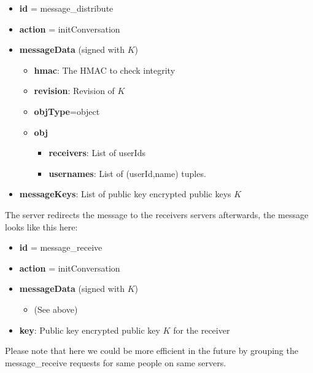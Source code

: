 \documentclass{scrartcl}
\begin{document}
\begin{itemize}
    \item \textbf{id} = message\_distribute
    \item \textbf{action} = initConversation
    \item \textbf{messageData} (signed with $K$)
  \begin{itemize}
    \item \textbf{hmac}: The HMAC to check integrity
    \item \textbf{revision}: Revision of $K$
    \item \textbf{objType}=object
     \item \textbf{obj}
     \begin{itemize}
        \item \textbf{receivers}: List of userIds
        \item \textbf{usernames}: List of (userId,name) tuples.
 \end{itemize}
    \end{itemize}
    \item \textbf{messageKeys}: List of public key encrypted public keys $K$
\end{itemize}


The server redirects the message to the receivers servers afterwards, the message looks like this here:

\begin{itemize}
    \item \textbf{id} = message\_receive
    \item \textbf{action} = initConversation
    \item \textbf{messageData} (signed with $K$)
    \begin{itemize}
    \item (See above)

    \end{itemize}
    \item \textbf{key}: Public key encrypted public key $K$ for the receiver
\end{itemize}

Please note that here we could be more efficient in the future by grouping the message\_receive requests for same people on same servers.


%            
            
\end{document}
